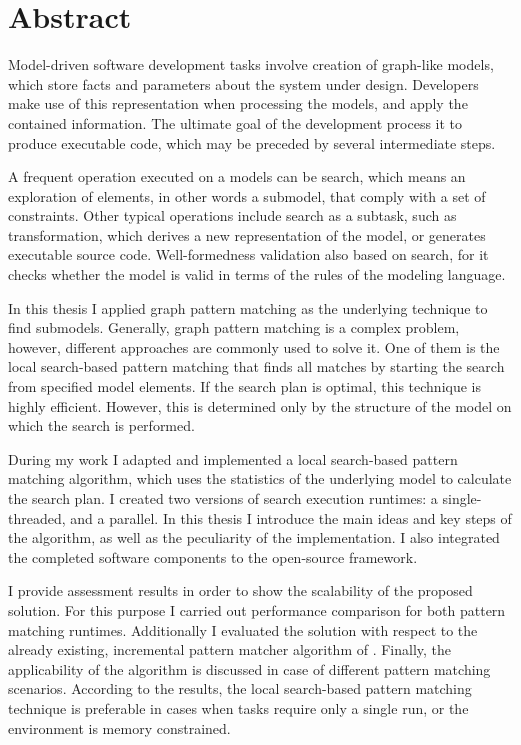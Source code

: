 \chapter*{Abstract}

Model-driven software development tasks involve creation of graph-like models, which store facts and parameters about the system under design. Developers make use of this representation when processing the models, and apply the contained information. The ultimate goal of the development process it to produce executable code, which may be preceded by several intermediate steps.

A frequent operation executed on a models can be search, which means an exploration of elements, in other words a submodel, that comply with a set of constraints. Other typical operations include search as a subtask, such as transformation, which derives a new representation of the model, or generates executable source code. Well-formedness validation also based on search, for it checks whether the model is valid in terms of the rules of the modeling language. 

In this thesis I applied graph pattern matching as the underlying technique to find submodels. Generally, graph pattern matching is a complex problem, however, different approaches are commonly used to solve it. One of them is the local search-based pattern matching that finds all matches by starting the search from specified model elements. If the search plan is optimal, this technique is highly efficient. However, this is determined only by the structure of the model on which the search is performed.

During my work I adapted and implemented a local search-based pattern matching algorithm, which uses the statistics of the underlying model to calculate the search plan. I created two versions of search execution runtimes: a single-threaded, and a parallel. In this thesis I introduce the main ideas and key steps of the algorithm, as well as the peculiarity of the implementation. I also integrated the completed software components to the open-source \eiq framework.

I provide assessment results in order to show the scalability of the proposed solution. For this purpose I carried out performance comparison for both pattern matching runtimes. Additionally I evaluated the solution with respect to the already existing, incremental pattern matcher algorithm of \eiq. Finally, the applicability of the algorithm is discussed in case of different pattern matching scenarios. According to the results, the local search-based pattern matching technique is preferable in cases when tasks require only a single run, or the environment is memory constrained. 


\vfill
\selectthesislanguage
\clearpage\null\newpage

\setcounter{romanPage}{\value{page}}
